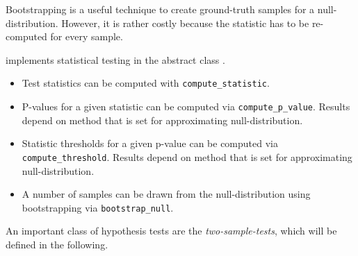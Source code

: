 Bootstrapping is a useful technique to create ground-truth samples for a null-distribution. However, it is rather costly because the statistic has to be re-computed for every sample.

\shogun{} implements statistical testing in the abstract class .
\begin{itemize}
\item Test statistics can be computed with \texttt{compute\_statistic}.
\item P-values for a given statistic can be computed via \texttt{compute\_p\_value}. Results depend on method that is set for approximating null-distribution.
\item Statistic thresholds for a given p-value can be computed via \texttt{compute\_threshold}. Results depend on method that is set for approximating null-distribution.
\item A number of samples can be drawn from the null-distribution using bootstrapping via \texttt{bootstrap\_null}.
\end{itemize}

An important class of hypothesis tests are the \emph{two-sample-tests}, which will be defined in the following.



